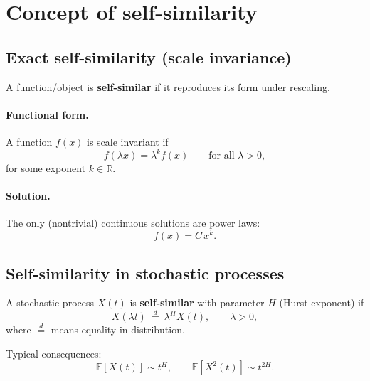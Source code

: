 
\section{Concept of self-similarity}

\subsection{Exact self-similarity (scale invariance)}
A function/object is \textbf{self-similar} if it reproduces its form under rescaling.

\paragraph{Functional form.}
A function $f(x)$ is scale invariant if
\begin{equation}
f(\lambda x)=\lambda^{k} f(x)
\qquad \text{for all }\lambda>0,
\end{equation}
for some exponent $k\in\mathbb{R}$.

\paragraph{Solution.}
The only (nontrivial) continuous solutions are power laws:
\begin{equation}
f(x)=C\,x^{k}.
\end{equation}

\subsection{Self-similarity in stochastic processes}
A stochastic process $X(t)$ is \textbf{self-similar} with parameter $H$ (Hurst exponent) if
\begin{equation}
X(\lambda t)\ \overset{d}{=}\ \lambda^{H}X(t),
\qquad \lambda>0,
\end{equation}
where $\overset{d}{=}$ means equality in distribution.

Typical consequences:
\begin{equation}
\mathbb{E}[X(t)]\sim t^{H},
\qquad
\mathbb{E}[X^2(t)]\sim t^{2H}.
\end{equation}

